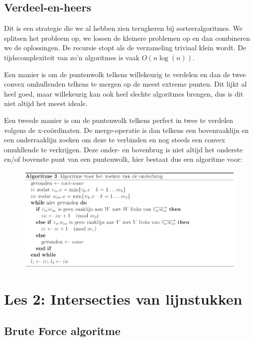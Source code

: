 \documentclass[12pt,a4paper]{article}
\begin{document}
	

	\subsection{Verdeel-en-heers}
	Dit is een strategie die we al hebben zien terugkeren bij sorteeralgoritmes. We splitsen het probleem op, we lossen de kleinere problemen op en dan combineren we de oplossingen. De recursie stopt als de verzameling triviaal klein wordt. De tijdscomplexiteit van zo'n algoritmes is vaak $O(n\log(n))$. 
	
	Een manier is om de puntenwolk telkens willekeurig te verdelen en dan de twee convex omhullenden telkens te mergen op de meest extreme punten. Dit lijkt al heel goed, maar willekeurig kan ook heel slechte algoritmes brengen, dus is dit niet altijd het meest ideale. 
	
	Een tweede manier is om de puntenwolk telkens perfect in twee te verdelen volgens de x-coördinaten. De merge-operatie is dan telkens een bovenraaklijn en een onderraaklijn zoeken om deze te verbinden en nog steeds een convex omuhllende te verkrijgen. Deze onder- en bovenbrug is niet altijd het onderste en/of bovenste punt van een puntenwolk, hier bestaat dus een algoritme voor: 
	
	\begin{figure}[h]
		\centering
		\includegraphics[width=0.9\linewidth]{afbeeldingen/verdeel-en-heers-convex}
		\label{fig:verdeel-en-heers-convex}
	\end{figure}
	
	
	\section{Les 2: Intersecties van lijnstukken}
	\subsection{Brute Force algoritme}
\end{document}

